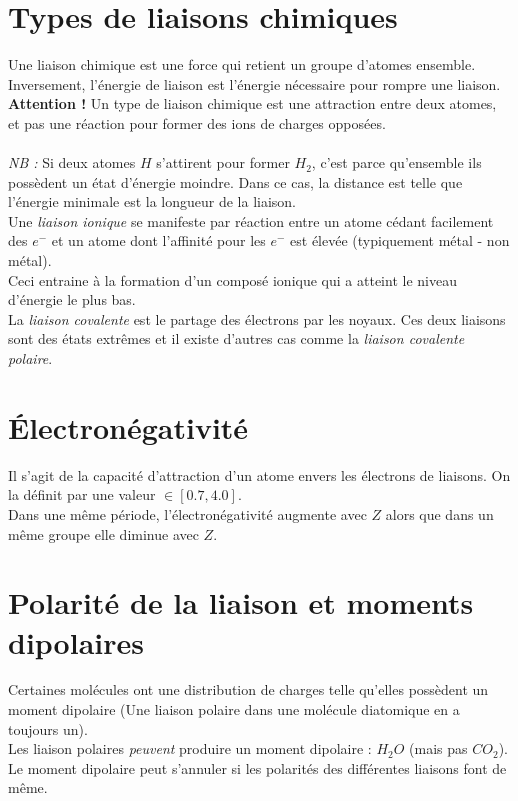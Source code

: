 \documentclass	[11pt, a4paper, openany]{book}
\begin{document}
\section{Types de liaisons chimiques}
Une liaison chimique est une force qui retient un groupe d'atomes ensemble. Inversement, l'énergie de liaison est l'énergie nécessaire pour rompre une liaison.\\
\textbf{Attention !} Un type de liaison chimique est une attraction entre deux atomes, et pas une réaction pour former des ions de charges opposées.\\\\
\textit{NB :} Si deux atomes $H$ s'attirent pour former $H_2$, c'est parce qu'ensemble ils possèdent un état d'énergie moindre. Dans ce cas, la distance est telle que l'énergie minimale est la longueur de la liaison.\\

Une \textit{liaison ionique} se manifeste par réaction entre un atome cédant facilement des $e^-$ et un atome dont l'affinité pour les $e^-$ est élevée (typiquement métal - non métal).\\
Ceci entraine à la formation d'un composé ionique qui a atteint le niveau d'énergie le plus bas.\\
La \textit{liaison covalente} est le partage des électrons par les noyaux. Ces deux liaisons sont des états extrêmes et il existe d'autres cas comme la \textit{liaison covalente polaire}.

\section{Électronégativité}
Il s'agit de la capacité d'attraction d'un atome envers les électrons de liaisons. On la définit par une valeur $\in [0.7, 4.0]$.\\
Dans une même période, l'électronégativité augmente avec $Z$ alors que dans un même groupe elle diminue avec $Z$.

\section{Polarité de la liaison et moments dipolaires}
Certaines molécules ont une distribution de charges telle qu'elles possèdent un moment dipolaire (Une liaison polaire dans une molécule diatomique en a toujours un).\\
Les liaison polaires \textit{peuvent} produire un moment dipolaire : $H_2O$ (mais pas $CO_2$).\\
Le moment dipolaire peut s'annuler si les polarités des différentes liaisons font de même.
\end{document}
